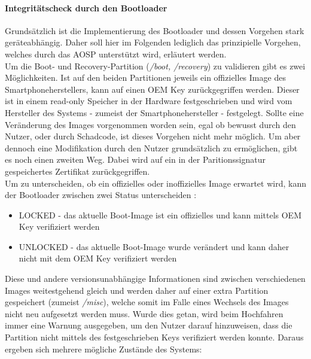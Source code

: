 	\paragraph{Integritätscheck durch den Bootloader}
	Grundsätzlich ist die Implementierung des Bootloader und dessen Vorgehen stark
	geräteabhängig. Daher soll hier im Folgenden lediglich das prinzipielle
	Vorgehen, welches durch das AOSP unterstützt wird, erläutert werden.\\
	Um die Boot- und Recovery-Partition (\textit{/boot, /recovery}) zu validieren
	gibt es zwei Möglichkeiten. Ist auf den beiden Partitionen jeweils ein 
	offizielles Image des Smartphoneherstellers, kann auf einen OEM Key
	zurückgegriffen werden. Dieser ist in einem read-only Speicher in der Hardware
	festgeschrieben und wird vom Hersteller des Systems - zumeist der
	Smartphonehersteller - festgelegt. Sollte eine Veränderung des Images
	vorgenommen worden sein, egal ob bewusst durch den Nutzer, oder durch
	Schadcode, ist dieses Vorgehen nicht mehr möglich. Um aber dennoch eine
	Modifikation durch den Nutzer grundsätzlich zu ermöglichen, gibt es noch einen
	zweiten Weg. Dabei wird auf ein in der Paritionssignatur gespeichertes
	Zertifikat zurückgegriffen.\\
	Um zu unterscheiden, ob ein offizielles oder inoffizielles Image erwartet
	wird, kann der Bootloader zwischen zwei Status
	unterscheiden \cite{VerifiedBoot}:
	\begin{itemize}\itemsep0pt
		\item LOCKED - das aktuelle Boot-Image ist ein offizielles und kann mittels OEM Key verifiziert werden
		\item UNLOCKED - das aktuelle Boot-Image wurde verändert und kann daher nicht mit dem OEM Key verifiziert werden
	\end{itemize}
	Diese und andere versionsunabhängige Informationen sind zwischen
	verschiedenen Images weitestgehend gleich und werden daher auf einer extra
	Partition gespeichert (zumeist \textit{/misc}), welche somit im Falle eines
	Wechsels des Images nicht neu aufgesetzt werden muss.
	Wurde dies getan, wird beim Hochfahren immer eine Warnung ausgegeben, um den
	Nutzer darauf hinzuweisen, dass die Partition nicht mittels des
	festgeschrieben Keys verifiziert werden konnte. Daraus ergeben sich mehrere
	mögliche Zustände des Systems:
